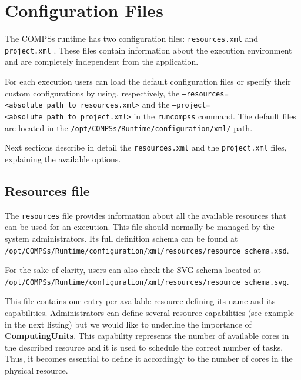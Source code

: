 \section{Configuration Files}
\label{sec:configuration_files}

The COMPSs runtime has two configuration files: \texttt{resources.xml} and \texttt{project.xml} . 
These files contain information about the execution environment and are completely independent from the application.

For each execution users can load the default configuration files or specify their custom configurations 
by using, respectively, the \texttt{--resources=<absolute\_path\_to\_resources.xml>} and the
\texttt{--project=<absolute\_path\_to\_project.xml>} in the \texttt{runcompss} command. The default files are located 
in the \texttt{/opt/COMPSs/Runtime/configuration/xml/} path. 

Next sections describe in detail the \texttt{resources.xml} and the \texttt{project.xml} files, 
explaining the available options.

\subsection{Resources file}
The \texttt{resources} file provides information about all the available resources that can be used for an execution. 
This file should normally be managed by the system administrators. Its full definition schema can be found at \\
\texttt{/opt/COMPSs/Runtime/configuration/xml/resources/resource\_schema.xsd}. 

For the sake of clarity, users can also check the SVG schema located at \\
\texttt{/opt/COMPSs/Runtime/configuration/xml/resources/resource\_schema.svg}.

This file contains one entry per available resource defining its name and its capabilities. Administrators can define several
resource capabilities (see example in the next listing) but we would like to underline the importance of 
\textbf{ComputingUnits}. This capability represents the number of available cores in the described resource and it is
used to schedule the correct number of tasks. Thus, it becomes essential to define it accordingly to the number of cores 
in the physical resource. 

